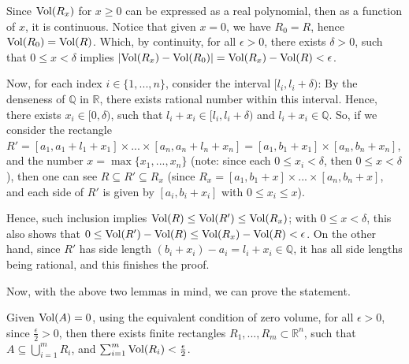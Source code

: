 \documentclass{article}
\begin{document}
\begin{itemize}
    Since $\textmd{Vol}(R_x)$ for $x\geq 0$ can be expressed as a real polynomial, then as a function of $x$, it is continuous. Notice that given $x=0$, we have $R_0 = R$, hence $\textmd{Vol}(R_0)=\textmd{Vol}(R)$. Which, by continuity, for all $\epsilon>0$, there exists $\delta>0$, such that $0\leq x<\delta$ implies $|\textmd{Vol}(R_x)-\textmd{Vol}(R_0)| = \textmd{Vol}(R_x)-\textmd{Vol}(R)<\epsilon$.

    Now, for each index $i\in\{1,...,n\}$, consider the interval $[l_i,l_i+\delta)$: By the denseness of $\mathbb{Q}$ in $\mathbb{R}$, there exists rational number within this interval. Hence, there exists $x_i\in [0,\delta)$, such that $l_i+x_i\in [l_i,l_i+\delta)$ and $l_i+x_i\in\mathbb{Q}$. So, if we consider the rectangle $R' = [a_1,a_1+l_1+x_1]\times ...\times[a_n,a_n+l_n+x_n] = [a_1,b_1+x_1]\times [a_n,b_n+x_n]$, and the number $x=\max\{x_1,...,x_n\}$ (note: since each $0\leq x_i<\delta$, then $0\leq x<\delta$), then one can see $R\subseteq R' \subseteq R_x$ (since $R_x=[a_1,b_1+x]\times...\times[a_n,b_n+x]$, and each side of $R'$ is given by $[a_i,b_i+x_i]$ with $0\leq x_i\leq x$). 
    
    Hence, such inclusion implies $\textmd{Vol}(R)\leq \textmd{Vol}(R')\leq \textmd{Vol}(R_x)$; with $0\leq x<\delta$, this also shows that $0\leq \textmd{Vol}(R')-\textmd{Vol}(R)\leq \textmd{Vol}(R_x)-\textmd{Vol}(R)<\epsilon$.
    On the other hand, since $R'$ has side length $(b_i+x_i)-a_i = l_i+x_i\in\mathbb{Q}$, it has all side lengths being rational, and this finishes the proof.

    \hfil

    Now, with the above two lemmas in mind, we can prove the statement.

    Given $\textmd{Vol}(A)=0$, using the equivalent condition of zero volume, for all $\epsilon>0$, since $\frac{\epsilon}{2}>0$, then there exists finite rectangles $R_1,...,R_m\subset\mathbb{R}^n$, such that $A\subseteq\bigcup_{i=1}^{m}R_i$, and $\sum_{i=1}^{m}\textmd{Vol}(R_i)<\frac{\epsilon}{2}$.


\end{itemize}
\end{document}

